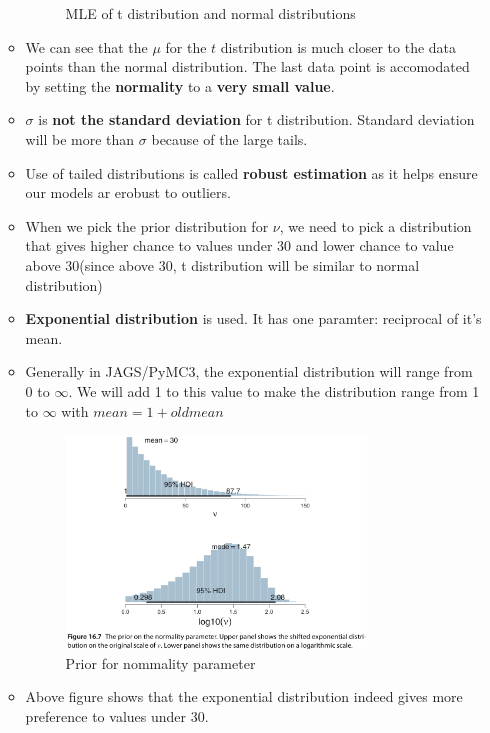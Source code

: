 \documentclass[a4paper]{article}
\begin{document}
\begin{itemize}
\begin{itemize}
\begin{figure}[H]
            \caption{MLE of t distribution and normal distributions}
            \label{fig:t_distribution_outliers}
        \end{figure}
    \item We can see that the $\mu$ for the $t$ distribution is much closer to the data points than the normal distribution. The last data point is accomodated by setting the \textbf{normality} to a \textbf{very small value}.  
    \item $\sigma$ is \textbf{not the standard deviation} for t distribution. Standard deviation will be more than $\sigma$ because of the large tails. 
    \item Use of tailed distributions is called \textbf{robust estimation} as it helps ensure our models ar erobust to outliers. 
    \item When we pick the prior distribution for $\nu$, we need to pick a distribution that gives higher chance to values under 30 and lower chance to value above 30(since above 30, t distribution will be similar to normal distribution)
    \item \textbf{Exponential distribution} is used. It has one paramter: reciprocal of it's mean. 
    \item Generally in JAGS/PyMC3, the exponential distribution will range from $0$ to $\infty$. We will add 1 to this value to make the distribution range from 1 to $\infty$ with $mean = 1 + oldmean$
    \begin{figure}[H]
        \centering
        \includegraphics[width=0.8\textwidth]{normality_prior}
        \caption{Prior for nommality parameter}
        \label{fig:normality_prior}
    \end{figure}
    \item Above figure shows that the exponential distribution indeed gives more preference to values under 30.

\end{itemize}
\end{itemize}
\end{document}

